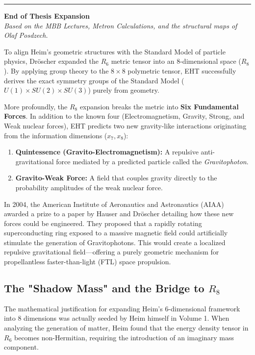 \documentclass[11pt,a4paper,oneside]{article}
\newcommand{\hr}{\par\vspace{2em}\noindent\rule{\linewidth}{0.4pt}\par\vspace{2em}}
\begin{document}
\hr

\begin{center}
    \textbf{End of Thesis Expansion} \\
    \textit{Based on the MBB Lectures, Metron Calculations, and the structural maps of Olaf Posdzech.}
\end{center}
To align Heim's geometric structures with the Standard Model of particle physics, Dröscher expanded the $R_6$ metric tensor into an 8-dimensional space ($R_8$). By applying group theory to the $8 \times 8$ polymetric tensor, EHT successfully derives the exact symmetry groups of the Standard Model ($U(1) \times SU(2) \times SU(3)$) purely from geometry.

More profoundly, the $R_8$ expansion breaks the metric into \textbf{Six Fundamental Forces}. In addition to the known four (Electromagnetism, Gravity, Strong, and Weak nuclear forces), EHT predicts two new gravity-like interactions originating from the information dimensions ($x_7, x_8$):
\begin{enumerate}
    \item \textbf{Quintessence (Gravito-Electromagnetism):} A repulsive anti-gravitational force mediated by a predicted particle called the \textit{Gravitophoton}.
    \item \textbf{Gravito-Weak Force:} A field that couples gravity directly to the probability amplitudes of the weak nuclear force.
\end{enumerate}

In 2004, the American Institute of Aeronautics and Astronautics (AIAA) awarded a prize to a paper by Hauser and Dröscher detailing how these new forces could be engineered. They proposed that a rapidly rotating superconducting ring exposed to a massive magnetic field could artificially stimulate the generation of Gravitophotons. This would create a localized repulsive gravitational field—offering a purely geometric mechanism for propellantless faster-than-light (FTL) space propulsion. 

\subsection{The "Shadow Mass" and the Bridge to $R_8$}
The mathematical justification for expanding Heim's 6-dimensional framework into 8 dimensions was actually seeded by Heim himself in Volume 1. When analyzing the generation of matter, Heim found that the energy density tensor in $R_6$ becomes non-Hermitian, requiring the introduction of an imaginary mass component.
\end{document}
